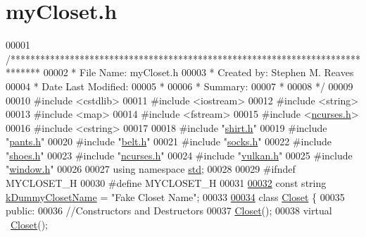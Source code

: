 \hypertarget{myCloset_8h_source}{}\section{my\+Closet.\+h}

\begin{DoxyCode}
00001 \textcolor{comment}{/******************************************************************************}
00002 \textcolor{comment}{ * File Name: myCloset.h}
00003 \textcolor{comment}{ * Created by: Stephen M. Reaves}
00004 \textcolor{comment}{ * Date Last Modified:}
00005 \textcolor{comment}{ *}
00006 \textcolor{comment}{ * Summary:}
00007 \textcolor{comment}{ *}
00008 \textcolor{comment}{ */}
00009 
00010 \textcolor{preprocessor}{#include <cstdlib>}
00011 \textcolor{preprocessor}{#include <iostream>}
00012 \textcolor{preprocessor}{#include <string>}
00013 \textcolor{preprocessor}{#include <map>}
00014 \textcolor{preprocessor}{#include <fstream>}
00015 \textcolor{preprocessor}{#include <\mbox{\hyperlink{ncurses_8h}{ncurses.h}}>}
00016 \textcolor{preprocessor}{#include <cstring>}
00017 
00018 \textcolor{preprocessor}{#include "\mbox{\hyperlink{shirt_8h}{shirt.h}}"}
00019 \textcolor{preprocessor}{#include "\mbox{\hyperlink{pants_8h}{pants.h}}"}
00020 \textcolor{preprocessor}{#include "\mbox{\hyperlink{belt_8h}{belt.h}}"}
00021 \textcolor{preprocessor}{#include "\mbox{\hyperlink{socks_8h}{socks.h}}"}
00022 \textcolor{preprocessor}{#include "\mbox{\hyperlink{shoes_8h}{shoes.h}}"}
00023 \textcolor{preprocessor}{#include "\mbox{\hyperlink{ncurses_8h}{ncurses.h}}"}
00024 \textcolor{preprocessor}{#include "\mbox{\hyperlink{vulkan_8h}{vulkan.h}}"}
00025 \textcolor{preprocessor}{#include "\mbox{\hyperlink{window_8h}{window.h}}"}
00026 
00027 \textcolor{keyword}{using namespace }\mbox{\hyperlink{namespacestd}{std}};
00028 
00029 \textcolor{preprocessor}{#ifndef MYCLOSET\_H}
00030 \textcolor{preprocessor}{#define MYCLOSET\_H}
00031 
\mbox{\hyperlink{myCloset_8h_abe246d8af0c0b6020aa175c2874b59be}{00032}} \textcolor{keyword}{const} \textcolor{keywordtype}{string} \mbox{\hyperlink{myCloset_8h_abe246d8af0c0b6020aa175c2874b59be}{kDummyClosetName}} = \textcolor{stringliteral}{"Fake Closet Name"};
00033 
\mbox{\hyperlink{classCloset}{00034}} \textcolor{keyword}{class }\mbox{\hyperlink{classCloset}{Closet}} \{
00035   \textcolor{keyword}{public}:
00036     \textcolor{comment}{//Constructors and Destructors}
00037     \mbox{\hyperlink{classCloset}{Closet}}();
00038     \textcolor{keyword}{virtual} ~\mbox{\hyperlink{classCloset}{Closet}}();

\end{DoxyCode}
